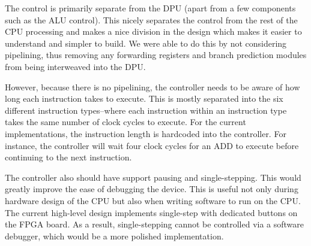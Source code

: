 \documentclass[lettersize,journal]{IEEEtran}
\begin{document}
The control is primarily separate from the DPU (apart from a few components such as the ALU control).
This nicely separates the control from the rest of the CPU processing and makes a nice division in the design which makes it easier to understand and simpler to build.
We were able to do this by not considering pipelining, thus removing any forwarding registers and branch prediction modules from being interweaved into the DPU.

However, because there is no pipelining, the controller needs to be aware of how long each instruction takes to execute.
This is mostly separated into the six different instruction types--where each instruction within an instruction type takes the same number of clock cycles to execute.
For the current implementations, the instruction length is hardcoded into the controller. For instance, the controller will wait four clock cycles for an ADD to execute
before continuing to the next instruction.

The controller also should have support pausing and single-stepping.
This would greatly improve the ease of debugging the device.
This is useful not only during hardware design of the CPU but also when writing software to run on the CPU.
The current high-level design implements single-step with dedicated buttons on the FPGA board.
As a result, single-stepping cannot be controlled via a software debugger, which would be a more polished implementation.
\end{document}

